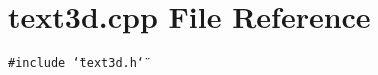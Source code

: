 \section{text3d.cpp File Reference}
\label{text3d_8cpp}
{\tt \#include \char`\"{}text3d.h\char`\"{}}\par
